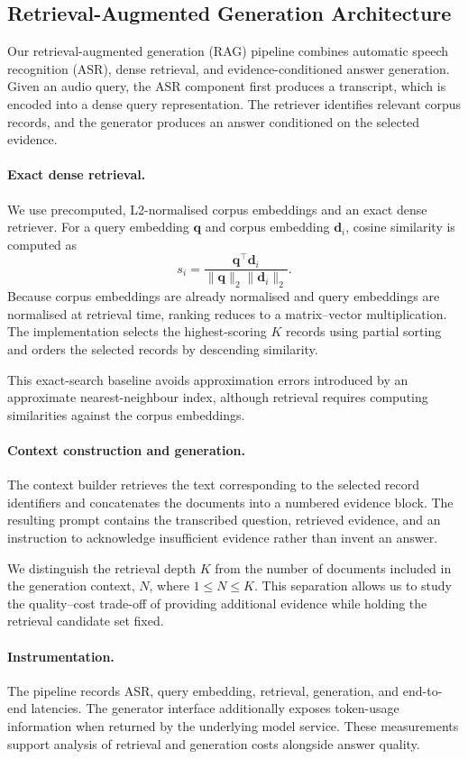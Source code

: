 \subsection{Retrieval-Augmented Generation Architecture}

Our retrieval-augmented generation (RAG) pipeline combines
automatic speech recognition (ASR), dense retrieval, and
evidence-conditioned answer generation. Given an audio query,
the ASR component first produces a transcript, which is
encoded into a dense query representation. The retriever
identifies relevant corpus records, and the generator
produces an answer conditioned on the selected evidence.

\paragraph{Exact dense retrieval.}
We use precomputed, L2-normalised corpus embeddings and
an exact dense retriever. For a query embedding
$\mathbf{q}$ and corpus embedding $\mathbf{d}_i$,
cosine similarity is computed as
\begin{equation}
s_i =
\frac{\mathbf{q}^{\top}\mathbf{d}_i}
{\|\mathbf{q}\|_2\|\mathbf{d}_i\|_2}.
\end{equation}
Because corpus embeddings are already normalised and
query embeddings are normalised at retrieval time,
ranking reduces to a matrix--vector multiplication.
The implementation selects the highest-scoring $K$
records using partial sorting and orders the selected
records by descending similarity.

This exact-search baseline avoids approximation errors
introduced by an approximate nearest-neighbour index,
although retrieval requires computing similarities
against the corpus embeddings.

\paragraph{Context construction and generation.}
The context builder retrieves the text corresponding
to the selected record identifiers and concatenates
the documents into a numbered evidence block.
The resulting prompt contains the transcribed question,
retrieved evidence, and an instruction to acknowledge
insufficient evidence rather than invent an answer.

We distinguish the retrieval depth $K$ from the number
of documents included in the generation context, $N$,
where $1 \leq N \leq K$. This separation allows us
to study the quality--cost trade-off of providing
additional evidence while holding the retrieval
candidate set fixed.

\paragraph{Instrumentation.}
The pipeline records ASR, query embedding, retrieval,
generation, and end-to-end latencies. The generator
interface additionally exposes token-usage information
when returned by the underlying model service.
These measurements support analysis of retrieval and
generation costs alongside answer quality.
